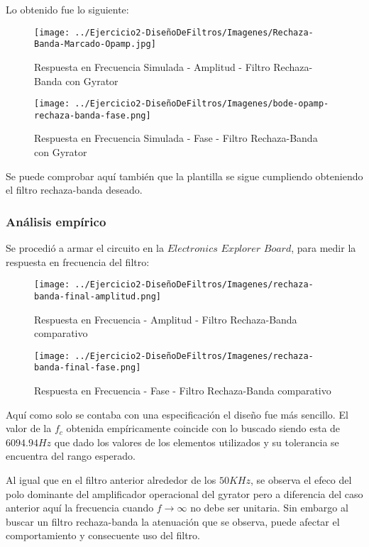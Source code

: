 Lo obtenido fue lo siguiente:

\begin{figure}[H]
    \centering
    \texttt{[image: ../Ejercicio2-DiseñoDeFiltros/Imagenes/Rechaza-Banda-Marcado-Opamp.jpg]}
    \caption{Respuesta en Frecuencia Simulada - Amplitud - Filtro Rechaza-Banda con Gyrator}
\end{figure}

\begin{figure}[H]
    \centering
    \texttt{[image: ../Ejercicio2-DiseñoDeFiltros/Imagenes/bode-opamp-rechaza-banda-fase.png]}
    \caption{Respuesta en Frecuencia Simulada - Fase - Filtro Rechaza-Banda con Gyrator}
\end{figure}

Se puede comprobar aquí también que la plantilla se sigue cumpliendo obteniendo el filtro rechaza-banda deseado.

\subsubsection{Análisis empírico}

Se procedió a armar el circuito en la $Electronics$ $Explorer$ $Board$, para medir la respuesta en frecuencia del filtro:

\begin{figure}[H]
    \centering
    \texttt{[image: ../Ejercicio2-DiseñoDeFiltros/Imagenes/rechaza-banda-final-amplitud.png]}
    \caption{Respuesta en Frecuencia - Amplitud - Filtro Rechaza-Banda comparativo}
\end{figure}

\begin{figure}[H]
    \centering
    \texttt{[image: ../Ejercicio2-DiseñoDeFiltros/Imagenes/rechaza-banda-final-fase.png]}
    \caption{Respuesta en Frecuencia - Fase - Filtro Rechaza-Banda comparativo}
\end{figure}

Aquí como solo se contaba con una especificación el diseño fue más sencillo. El valor de la $f_c$ obtenida empíricamente coincide con lo buscado
siendo esta de $6094.94 Hz$ que dado los valores de los elementos utilizados y su tolerancia se encuentra del rango esperado.

Al igual que en el filtro anterior alrededor de los $50KHz$, se observa el efeco del polo dominante del amplificador operacional del gyrator pero a diferencia
del caso anterior aquí la frecuencia cuando $f \to \infty$ no debe ser unitaria. Sin embargo al buscar un filtro rechaza-banda la atenuación que se observa, puede
afectar el comportamiento y consecuente uso del filtro. 

